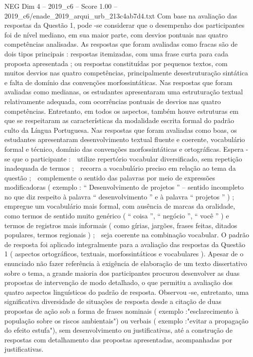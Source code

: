 \begin{textsample}{NEG Dim 4 – 2019\_c6 – Score 1.00 – 2019\_c6/enade\_2019\_arqui\_urb\_213c4ab7d4.txt}
Com base na avaliação das respostas da Questão 1, pode -se considerar que o desempenho dos participantes foi de nível mediano, em sua maior parte, com desvios pontuais nas quatro competências analisadas.
As respostas que foram avaliadas como fracas são de dois tipos principais : respostas itemizadas, com uma frase curta para cada proposta apresentada ; ou respostas constituídas por pequenos textos, com muitos desvios nas quatro competências, principalmente desestruturação sintática e falta de domínio das convenções morfossintáticas.
Nas respostas que foram avaliadas como medianas, os estudantes apresentaram uma estruturação textual relativamente adequada, com ocorrências pontuais de desvios nas quatro competências.
Entretanto, em todos os aspectos, também houve estruturas em que se respeitaram as características da modalidade escrita formal do padrão culto da Língua Portuguesa.
Nas respostas que foram avaliadas como boas, os estudantes apresentaram desenvolvimento textual fluente e coerente, vocabulário formal e técnico, domínio das convenções morfossintáticas e ortográficas.
Espera -se que o participante :  utilize repertório vocabular diversificado, sem repetição inadequada de termos ;  recorra a vocabulário preciso em relação ao tema da questão ;  complemente o sentido das palavras por meio de expressões modificadoras ( exemplo : “ Desenvolvimento de projetos ” – sentido incompleto no que diz respeito à palavra “ desenvolvimento ” e à palavra “ projetos ” ) ;  empregue um vocabulário mais formal, com ausência de marcas da oralidade, como termos de sentido muito genérico ( “ coisa ”, “ negócio ”, “ você ” ) e termos de registros mais informais ( como gírias, jargões, frases feitas, ditados populares, termos regionais ) ;  seja coerente na combinação vocabular.
O padrão de resposta foi aplicado integralmente para a avaliação das respostas da Questão 1 ( aspectos ortográficos, textuais, morfossintáticos e vocabulares ).
Apesar de o enunciado não fazer referência à exigência de elaboração de um texto dissertativo sobre o tema, a grande maioria dos participantes procurou desenvolver as duas propostas de intervenção de modo detalhado, o que permitiu a avaliação dos quatro aspectos linguísticos do padrão de resposta.
Observou -se, entretanto, uma significativa diversidade de situações de resposta desde a citação de duas propostas de ação sob a forma de frases nominais ( exemplo :"esclarecimento à população sobre os riscos ambientais") ou verbais ( exemplo :"evitar a propagação do efeito estufa"), sem desenvolvimento ou justificativas, até a construção de respostas com detalhamento das propostas apresentadas, acompanhadas por justificativas.

\end{textsample}
